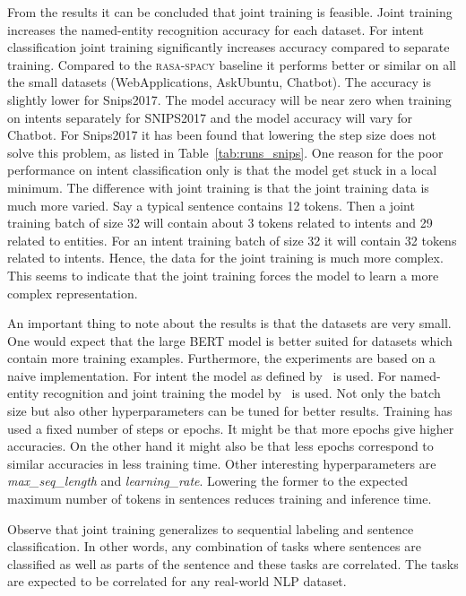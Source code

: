 From the results it can be concluded that joint training is feasible.
Joint training increases the named-entity recognition accuracy for each dataset.
For intent classification joint training significantly increases accuracy compared to separate training.
Compared to the \textsc{rasa-spacy} baseline it performs better or similar on all the small datasets (WebApplications, AskUbuntu, Chatbot).
The accuracy is slightly lower for Snips2017.
The model accuracy will be near zero when training on intents separately for SNIPS2017 and the model accuracy will vary for Chatbot.
For Snips2017 it has been found that lowering the step size does not solve this problem, as listed in Table~\ref{tab:runs_snips}.
One reason for the poor performance on intent classification only is that the model get stuck in a local minimum.
The difference with joint training is that the joint training data is much more varied.
Say a typical sentence contains 12 tokens.
Then a joint training batch of size 32 will contain about 3 tokens related to intents and 29 related to entities.
For an intent training batch of size 32 it will contain 32 tokens related to intents.
Hence, the data for the joint training is much more complex.
This seems to indicate that the joint training forces the model to learn a more complex representation.

An important thing to note about the results is that the datasets are very small.
One would expect that the large BERT model is better suited for datasets which contain more training examples.
Furthermore, the experiments are based on a naive implementation.
For intent the model as defined by~\citet{devlin2018github} is used.
For named-entity recognition and joint training the model by~\citet{kyzhouhzau2018ner} is used.
Not only the batch size but also other hyperparameters can be tuned for better results.
Training has used a fixed number of steps or epochs.
It might be that more epochs give higher accuracies.
On the other hand it might also be that less epochs correspond to similar accuracies in less training time.
Other interesting hyperparameters are \textit{max\_seq\_length} and \textit{learning\_rate}.
Lowering the former to the expected maximum number of tokens in sentences reduces training and inference time.

Observe that joint training generalizes to sequential labeling and sentence classification.
In other words, any combination of tasks where sentences are classified as well as parts of the sentence and these tasks are correlated.
The tasks are expected to be correlated for any real-world NLP dataset.


